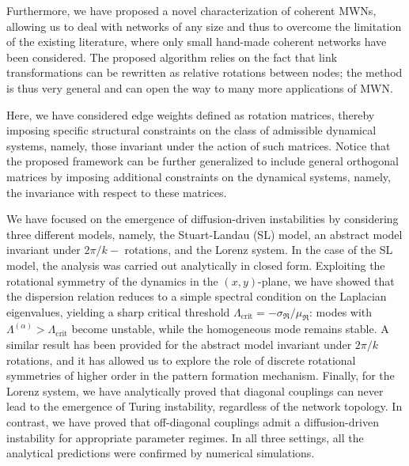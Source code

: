 \documentclass[aps,showpacs,preprintnumbers,amsmath,amssymb,twocolumn,superscriptaddress,floatfix,nofootinbib,10pt,pre]{revtex4-1}
\begin{document}
Furthermore, we have proposed a novel characterization of coherent MWNs, allowing us to deal with networks of any size and thus to overcome the limitation of the existing literature, where only small hand-made coherent networks have been considered. The proposed algorithm relies on the fact that link transformations can be rewritten as relative rotations between nodes; the method is thus very general and can open the way to many more applications of MWN.

Here, we have considered edge weights defined as rotation matrices, thereby imposing specific structural constraints on the class of admissible dynamical systems, namely, those invariant under the action of such matrices. Notice that the proposed framework can be further generalized to include general orthogonal matrices by imposing additional constraints on the dynamical systems, namely, the invariance with respect to these matrices. 

We have focused on the emergence of diffusion-driven instabilities by considering three different models, namely, the Stuart-Landau (SL) model, an abstract model invariant under $2\pi/k-$ rotations, and the Lorenz system. In the case of the SL model, the analysis was carried out analytically in closed form. Exploiting the rotational symmetry of the dynamics in the $(x,y)$-plane, we have showed that the dispersion relation reduces to a simple spectral condition on the Laplacian eigenvalues, yielding a sharp critical threshold $\Lambda_{\text{crit}} = -\sigma_{\Re}/\mu_{\Re}$: modes with $\Lambda^{(\alpha)} > \Lambda_{\text{crit}}$ become unstable, while the homogeneous mode remains stable. A similar result has been provided for the abstract model invariant under $2\pi/k$ rotations, and it has allowed us to explore the role of discrete rotational symmetries of higher order in the pattern formation mechanism. Finally, for the Lorenz system, we have analytically proved that diagonal couplings can never lead to the emergence of Turing instability, regardless of the network topology. In contrast, we have proved that off-diagonal couplings admit a diffusion-driven instability for appropriate parameter regimes.  In all three settings, all the analytical predictions were confirmed by numerical simulations.
\end{document}
